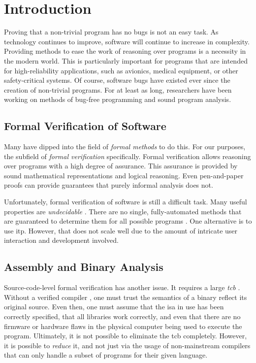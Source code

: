 \chapter{Introduction}\label{introduction}
Proving that a non-trivial program has no bugs is not an easy task.
As technology continues to improve, software will continue to increase in complexity.
Providing methods to ease the work of reasoning over programs is a necessity in the modern world.
This is particularly important for programs that are intended for high-reliability applications,
such as avionics, medical equipment, or other safety-critical systems.
Of course, software bugs have existed ever since the creation of non-trivial programs.
For at least as long, researchers have been working on methods of bug-free programming and sound program analysis.

\section{Formal Verification of Software}
Many have dipped into the field of \emph{formal methods} \autocite{butler:fm} to do this.
For our purposes, the subfield of \emph{formal verification} specifically.
Formal verification allows reasoning over programs with a high degree of assurance.
This assurance is provided by sound mathematical representations and logical reasoning.
Even pen-and-paper proofs can provide guarantees that purely informal analysis does not.

Unfortunately, formal verification of software is still a difficult task.
Many useful properties are \emph{undecidable} \autocite{rice1953classes,horspool1980approach,ouimet2008formal}.
There are no single, fully-automated methods that are guaranteed to determine them for all possible programs \autocite{bonacina2010theoremproving}.
One alternative is to use \gls{itp}.
However, that does not scale well due to the amount of intricate user interaction and development involved.

\section{Assembly and Binary Analysis}\label{intro-analysis}
Source-code-level formal verification has another issue.
It requires a large \emph{\gls{tcb}}
\autocites[270]{lampson1992authentication}{orange-book}[13]{rushby1981dvss}.
Without a verified compiler \autocite{leroy:compcert}, one must trust the semantics of a binary reflect its original source.
Even then, one must assume that the \gls{isa} in use has been correctly specified, that all libraries work correctly, and even that there are no firmware or hardware flaws in the physical computer being used to execute the program.
Ultimately, it is not possible to eliminate the \gls{tcb} completely.
However, it is possible to \emph{reduce} it, and not just via the usage of non-mainstream compilers that can only handle a subset of programs for their given language.

